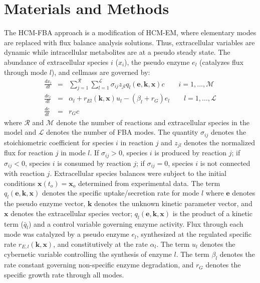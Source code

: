 \documentclass[10pt,twocolumn,twoside,final]{IEEEtran}
\begin{document}
\section{Materials and Methods}
The HCM-FBA approach is a modification of HCM-EM, where elementary modes are replaced with flux balance analysis solutions.
Thus, extracellular variables are dynamic while intracellular metabolites are at a pseudo steady state.
The abundance of extracellular species $i$ ($x_{i}$), the pseudo enzyme $e_{l}$ (catalyzes flux through mode $l$), and cellmass are governed by:
\begin{eqnarray}\nonumber
	\frac{dx_{i}}{dt}  & = &  \sum_{j = 1}^{\mathcal{R}}\sum_{l = 1}^{\mathcal{L}}\sigma_{ij}z_{jl}q_{l}\left(\mathbf{e},\mathbf{k},\mathbf{x}\right)c \qquad{i=1,\hdots,\mathcal{M}}\\\nonumber
  \frac{de_{l}}{dt}  & = & \alpha_{l} + r_{El}\left(\mathbf{k},\mathbf{x}\right)u_{l} - \left(\beta_{l}+r_{G}\right)e_{l} \qquad l=1,\hdots,\mathcal{L} \\\nonumber
  \frac{dc}{dt} & = & r_{G}c
\end{eqnarray}
where $\mathcal{R}$ and $\mathcal{M}$ denote the number of reactions and extracellular species in the model and $\mathcal{L}$ denotes the number of FBA modes.
The quantity $\sigma_{ij}$ denotes the stoichiometric coefficient for species $i$ in reaction $j$ and $z_{jl}$ denotes the normalized flux for reaction $j$ in mode $l$.
If $\sigma_{ij}>0$, species $i$ is produced by reaction $j$;
if $\sigma_{ij}<0$, species $i$ is consumed by reaction $j$; if $\sigma_{ij} = 0$, species $i$ is not connected with reaction $j$.
Extracellular species balances were subject to the initial conditions $\mathbf{x}\left(t_{o}\right) = \mathbf{x}_{o}$ determined from experimental data.
The term $q_{l}\left(\mathbf{e},\mathbf{k},\mathbf{x}\right)$ denotes the specific uptake/secretion rate for mode $l$
where $\mathbf{e}$ denotes the pseudo enzyme vector, $\mathbf{k}$ denotes the unknown kinetic parameter vector, and $\mathbf{x}$ denotes the extracellular species vector;
$q_{l}\left(\mathbf{e},\mathbf{k},\mathbf{x}\right)$ is the product of a kinetic term ($\bar{q}_{l}$) and a control variable governing enzyme activity.
Flux through each mode was catalyzed by a pseudo enzyme $e_{l}$, synthesized at the regulated specific rate $r_{E,l}\left(\mathbf{k},\mathbf{x}\right)$, and constitutively at the rate $\alpha_{l}$.
The term $u_{l}$ denotes the cybernetic variable controlling the synthesis of enzyme $l$.
The term $\beta_{l}$ denotes the rate constant governing non-specific enzyme degradation, and $r_{G}$ denotes the specific growth rate through all modes.
\end{document}
